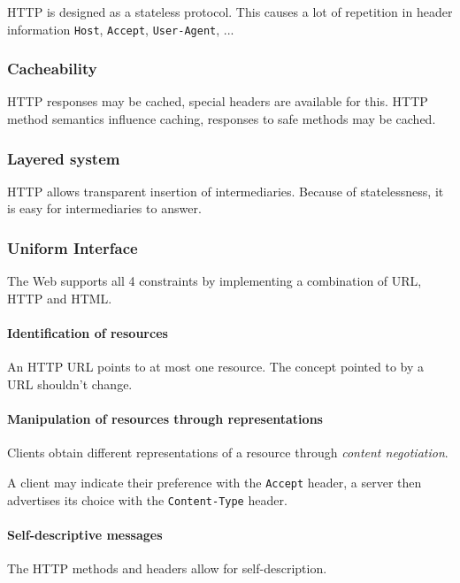 \documentclass{report}
\begin{document}
HTTP is designed as a stateless protocol.
This causes a lot of repetition in header information
\texttt{Host}, \texttt{Accept}, \texttt{User-Agent}, ...

\subsubsection{Cacheability}

HTTP responses may be cached,
special headers are available for this.
HTTP method semantics influence caching,
responses to safe methods may be cached.

\subsubsection{Layered system}

HTTP allows transparent insertion of intermediaries.
Because of statelessness,
it is easy for intermediaries to answer.

\subsubsection{Uniform Interface}

The Web supports all 4 constraints
by implementing a combination of URL, HTTP and HTML.

\paragraph{Identification of resources}

An HTTP URL points to at most one resource.
The concept pointed to by a URL shouldn't change.

\paragraph{Manipulation of resources through representations}

Clients obtain different representations of a resource
through \textit{content negotiation}.

A client may indicate their preference
with the \texttt{Accept} header,
a server then advertises its choice
with the \texttt{Content-Type} header.

\paragraph{Self-descriptive messages}

The HTTP methods and headers allow for self-description.
\end{document}
